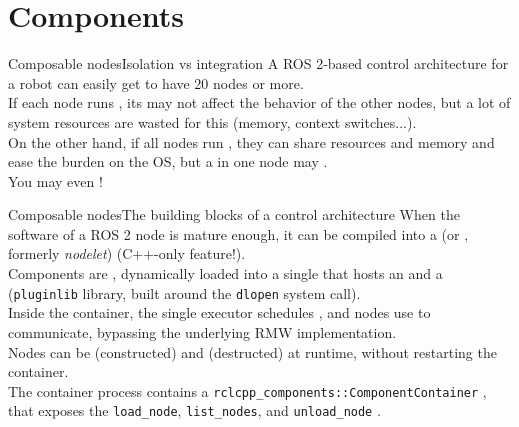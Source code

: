 
\section{Components}

\begin{frame}{Composable nodes}{Isolation vs integration}
  A ROS 2-based control architecture for a robot can easily get to have 20 nodes or more.\\
  \bigskip
  If each node runs , its  may not affect the behavior of the other nodes, but a lot of system resources are wasted for this (memory, context switches...).\\
  \bigskip
  On the other hand, if all nodes run , they can share resources and memory and ease the burden on the OS, but a  in one node may .\\
  \bigskip
  You may even !
\end{frame}
\begin{frame}{Composable nodes}{The building blocks of a control architecture}
  When the software of a ROS 2 node is mature enough, it can be compiled into a  (or , formerly \emph{nodelet}) (C++-only feature!).\\
  \bigskip
  Components are , dynamically loaded into a single  that hosts an  and a  (\texttt{pluginlib} library, built around the \texttt{dlopen} system call).\\
  \bigskip
  Inside the container, the single executor schedules , and nodes use  to communicate, bypassing the underlying RMW implementation.\\
  \bigskip
  Nodes can be  (constructed) and  (destructed) at runtime, without restarting the container.\\
  \bigskip
  The container process contains a \texttt{rclcpp\_components::ComponentContainer} , that exposes the \texttt{load\_node}, \texttt{list\_nodes}, and \texttt{unload\_node} .
\end{frame}
